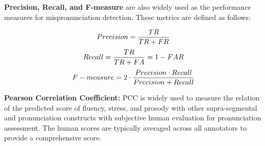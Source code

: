 \documentclass[11pt]{article}
\begin{document}
\noindent \textbf{Precision, Recall, and F-measure}
are also widely used as the performance measures for mispronunciation detection. 
These metrics are defined as follows:

\begin{equation}
\small
Precision = \frac{TR}{TR + FR}
\end{equation}
\begin{equation}
\small
Recall = \frac{TR}{TR + FA} = 1 - FAR
\end{equation}
\begin{equation}
\small
F-measure = 2 \cdot \frac{Precision \cdot Recall}{Precision + Recall}
\end{equation}

\noindent \textbf{Pearson Correlation Coefficient:} 
PCC is widely used to measure the relation of the predicted score of fluency, stress, and prosody with other supra-segmental and pronunciation constructs with  subjective human evaluation  for pronunciation assessment. The human scores are typically averaged across all annotators to provide a comprehensive score.


\end{document}

